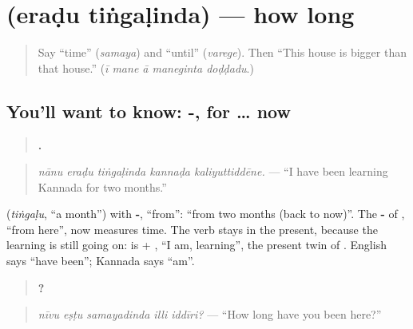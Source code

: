 \section[\texorpdfstring{\kn{ಎರಡು} \kn{ತಿಂಗಳಿಂದ} (eraḍu tiṅgaḷinda)}{ಎರಡು ತಿಂಗಳಿಂದ (eraḍu tiṅgaḷinda)}]{  (eraḍu tiṅgaḷinda) — how long}

\label{lesson:KA-C316-tingalinda}



\begin{quote}
Say \textquotedblleft{}time\textquotedblright{} (\emph{samaya}) and \textquotedblleft{}until\textquotedblright{} (\emph{varege}). Then \textquotedblleft{}This house is bigger than that house.\textquotedblright{} (\emph{ī mane ā maneginta doḍḍadu}.)
\end{quote}

\subsection*{You'll want to know: -, for … now}
\begin{quote}
\textbf{    .}
\end{quote}

\begin{quote}
\emph{nānu eraḍu tiṅgaḷinda kannaḍa kaliyuttiddēne.} — \textquotedblleft{}I have been learning Kannada for two months.\textquotedblright{}
\end{quote}

\textbf{} (\emph{tiṅgaḷu}, \textquotedblleft{}a month\textquotedblright{}) with \textbf{-}, \textquotedblleft{}from\textquotedblright{}: \textquotedblleft{}from two months (back to now)\textquotedblright{}. The \textbf{-} of \textbf{}, \textquotedblleft{}from here\textquotedblright{}, now measures time. The verb stays in the present, because the learning is still going on: \textbf{} is \textbf{} + \textbf{}, \textquotedblleft{}I am, learning\textquotedblright{}, the present twin of \textbf{}. English says \textquotedblleft{}have been\textquotedblright{}; Kannada says \textquotedblleft{}am\textquotedblright{}.

\begin{quote}
\textbf{    ?}
\end{quote}

\begin{quote}
\emph{nīvu eṣṭu samayadinda illi iddīri?} — \textquotedblleft{}How long have you been here?\textquotedblright{}
\end{quote}

